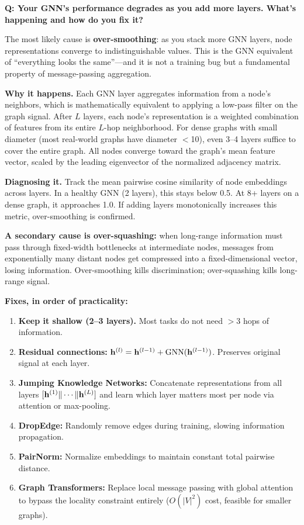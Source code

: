 \begin{interviewq}
\textbf{Q: Your GNN's performance degrades as you add more layers. What's happening and how do you fix it?}

 \quad {} \quad \badgefreq{\freqmed}

\stronganswer

The most likely cause is \textbf{over-smoothing}: as you stack more GNN layers, node representations converge to indistinguishable values. This is the GNN equivalent of ``everything looks the same''---and it is not a training bug but a fundamental property of message-passing aggregation.

\textbf{Why it happens.} Each GNN layer aggregates information from a node's neighbors, which is mathematically equivalent to applying a low-pass filter on the graph signal. After $L$ layers, each node's representation is a weighted combination of features from its entire $L$-hop neighborhood. For dense graphs with small diameter (most real-world graphs have diameter $<$10), even 3--4 layers suffice to cover the entire graph. All nodes converge toward the graph's mean feature vector, scaled by the leading eigenvector of the normalized adjacency matrix.

\textbf{Diagnosing it.} Track the mean pairwise cosine similarity of node embeddings across layers. In a healthy GNN (2 layers), this stays below 0.5. At 8+ layers on a dense graph, it approaches 1.0. If adding layers monotonically increases this metric, over-smoothing is confirmed.

\textbf{A secondary cause is over-squashing:} when long-range information must pass through fixed-width bottlenecks at intermediate nodes, messages from exponentially many distant nodes get compressed into a fixed-dimensional vector, losing information. Over-smoothing kills discrimination; over-squashing kills long-range signal.

\textbf{Fixes, in order of practicality:}
\begin{enumerate}
    \item \textbf{Keep it shallow (2--3 layers).} Most tasks do not need $>$3 hops of information.
    \item \textbf{Residual connections:} $\mathbf{h}^{(l)} = \mathbf{h}^{(l-1)} + \text{GNN}(\mathbf{h}^{(l-1)})$. Preserves original signal at each layer.
    \item \textbf{Jumping Knowledge Networks:} Concatenate representations from all layers $[\mathbf{h}^{(1)} \| \cdots \| \mathbf{h}^{(L)}]$ and learn which layer matters most per node via attention or max-pooling.
    \item \textbf{DropEdge:} Randomly remove edges during training, slowing information propagation.
    \item \textbf{PairNorm:} Normalize embeddings to maintain constant total pairwise distance.
    \item \textbf{Graph Transformers:} Replace local message passing with global attention to bypass the locality constraint entirely ($O(|V|^2)$ cost, feasible for smaller graphs).
\end{enumerate}


\end{interviewq}

